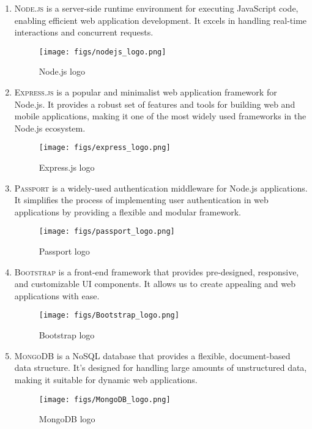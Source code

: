 \documentclass[conference]{IEEEtran}
\begin{document}
\begin{enumerate}
    \item \textsc{Node.js} is a server-side runtime environment for executing JavaScript code, enabling efficient web application development. It excels in handling real-time interactions and concurrent requests.
        \begin{figure}[H]
        \centering
        \texttt{[image: figs/nodejs\_logo.png]}
        \caption{Node.js logo}
        \label{fig:Node.js logo}
        \end{figure}
    \item \textsc{Express.js} is a popular and minimalist web application framework for Node.js. It provides a robust set of features and tools for building web and mobile applications, making it one of the most widely used frameworks in the Node.js ecosystem.
        \begin{figure}[H]
        \centering
        \texttt{[image: figs/express\_logo.png]}
        \caption{Express.js logo}
        \label{fig:Express.js logo}
        \end{figure}
    \item \textsc{Passport} is a widely-used authentication middleware for Node.js applications. It simplifies the process of implementing user authentication in web applications by providing a flexible and modular framework.
        \begin{figure}[H]
        \centering
        \texttt{[image: figs/passport\_logo.png]}
        \caption{Passport logo}
        \label{fig:Passport logo}
        \end{figure}
    \item \textsc{Bootstrap} is a front-end framework that provides pre-designed, responsive, and customizable UI components. It allows us to create appealing and web applications with ease.
        \begin{figure}[H]
        \centering
        \texttt{[image: figs/Bootstrap\_logo.png]}
        \caption{Bootstrap logo}
        \label{fig:Bootstrap logo}
        \end{figure}
    \item \textsc{MongoDB} is a NoSQL database that provides a flexible, document-based data structure. It's designed for handling large amounts of unstructured data, making it suitable for dynamic web applications.
        \begin{figure}[H]
        \centering
        \texttt{[image: figs/MongoDB\_logo.png]}
        \caption{MongoDB logo}

\end{figure}
\end{enumerate}
\end{document}
